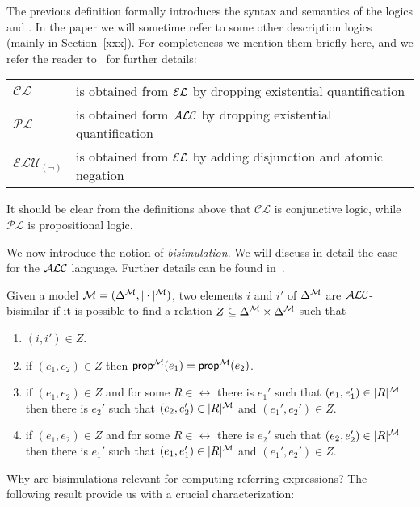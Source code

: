 The previous definition formally introduces the syntax and semantics of the
logics \alc and \el.  In the paper we will sometime refer to some other description logics (mainly in Section~\ref{xxx}).  For completeness we mention them briefly here,
and we refer the reader to~\cite{baad:desc03} for further details:

\begin{center}
\begin{tabular}{lp{6cm}}
$\mathcal{CL}$ & is obtained from $\mathcal{EL}$ by dropping existential quantification\\
$\mathcal{PL}$ & is obtained form $\mathcal{ALC}$ by dropping existential quantification\\
$\mathcal{ELU}_{(\neg)}$ & is obtained from $\mathcal{EL}$ by adding disjunction and atomic negation
\end{tabular}
\end{center}

\noindent
It should be clear from the definitions above that $\mathcal{CL}$ is conjunctive logic, while $\mathcal{PL}$ is propositional logic.

We now introduce the notion of \emph{bisimulation}.  We will discuss in detail
the case for the $\mathcal{ALC}$ language.  Further details can be found
in~\cite{blac:moda01,kurt:expr99}.

\begin{definition}
Given a model $\mathcal{M} = (\Delta^{\mathcal{M}},|\cdot|^{\mathcal{M}})$, two elements $i$ and $i'$ of $\Delta^{\mathcal{M}}$ are $\mathcal{ALC}$-bisimilar if it is possible to find a relation $Z \subseteq \Delta^{\mathcal{M}} \times \Delta^{\mathcal{M}}$ such that
\begin{enumerate}
\item $(i,i') \in Z$.
\item if $(e_1, e_2) \in Z$ then $\textsf{prop}^{\mathcal{M}}(e_1) = \textsf{prop}^{\mathcal{M}}(e_2)$.
\item if $(e_1,e_2) \in Z$ and for some $R \in \rel$ there is $e_1'$ such that
$(e_1,e_1') \in |R|^{\mathcal{M}}$ then there is $e_2'$ such that $(e_2,e_2') \in |R|^{\mathcal{M}}$ and
$(e_1',e_2') \in Z$.
\item if $(e_1,e_2) \in Z$ and for some $R \in \rel$ there is $e_2'$ such that
$(e_2,e_2') \in |R|^{\mathcal{M}}$ then there is $e_1'$ such that $(e_1,e_1') \in |R|^{\mathcal{M}}$ and
$(e_1',e_2') \in Z$.
\end{enumerate}
\end{definition}

Why are bisimulations relevant for computing referring expressions?
The following result provide us with a crucial characterization:

